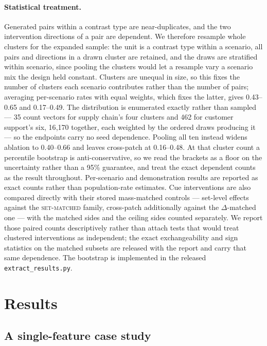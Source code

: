 \documentclass{article}
\begin{document}
\paragraph{Statistical treatment.} Generated pairs within a contrast type are near-duplicates, and the two intervention directions of a pair are dependent. We therefore resample whole clusters for the expanded sample: the unit is a contrast type within a scenario, all pairs and directions in a drawn cluster are retained, and the draws are stratified within scenario, since pooling the clusters would let a resample vary a scenario mix the design held constant. Clusters are unequal in size, so this fixes the number of clusters each scenario contributes rather than the number of pairs; averaging per-scenario rates with equal weights, which fixes the latter, gives 0.43--0.65 and 0.17--0.49. The distribution is enumerated exactly rather than sampled --- 35 count vectors for supply chain's four clusters and 462 for customer support's six, 16{,}170 together, each weighted by the ordered draws producing it --- so the endpoints carry no seed dependence. Pooling all ten instead widens ablation to 0.40--0.66 and leaves cross-patch at 0.16--0.48. At that cluster count a percentile bootstrap is anti-conservative, so we read the brackets as a floor on the uncertainty rather than a 95\% guarantee, and treat the exact dependent counts as the result throughout. Per-scenario and demonstration results are reported as exact counts rather than population-rate estimates. Cue interventions are also compared directly with their stored mass-matched controls --- set-level effects against the \textsc{set-matched} family, cross-patch additionally against the $\Delta$-matched one --- with the matched sides and the ceiling sides counted separately. We report those paired counts descriptively rather than attach tests that would treat clustered interventions as independent; the exact exchangeability and sign statistics on the matched subsets are released with the report and carry that same dependence. The bootstrap is implemented in the released \texttt{extract\_results.py}.

\section{Results}
\label{sec:results}

\subsection{A single-feature case study}
\label{sec:single}
\end{document}
